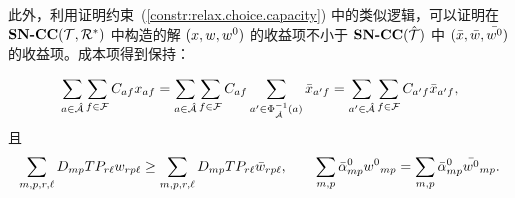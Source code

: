 此外，利用证明约束~(\ref{constr:relax.choice.capacity}) 中的类似逻辑，可以证明在 $\textbf{SN-CC}({\mathcal{T}, \mathcal{R}^{*}})$ 中构造的解 $(x, w, {w^0})$ 的收益项不小于 $\textbf{SN-CC}({\hat{\mathcal{T}}})$ 中 $(\bar{x}, \bar{w}, \bar{{w^0}})$ 的收益项。成本项得到保持：

\[
    \sum_{a\in\arcSet}\sum_{f\in\fleetSet}\cost_{af}\fleetAssignVar_{af}
    = \sum_{a\in\arcSet}\sum_{f\in\fleetSet}\cost_{af}
      \sum_{a'\in\Phi_{\arcSet}^{-1}(a)}\bar{\fleetAssignVar}_{a'f}
    = \sum_{a'\in\full{\arcSet}}\sum_{f\in\fleetSet}\cost_{a'f}\bar{\fleetAssignVar}_{a'f},
\]
且
\[
    \sum_{m,p,r,\ell}D_{mp}TP_{r\ell}w_{rp\ell}
    \ge \sum_{m,p,r,\ell}D_{mp}TP_{r\ell}\bar{w}_{rp\ell},
    \qquad
    \sum_{m,p}\bar{\alpha}^0_{mp}{w^0}_{mp}
    = \sum_{m,p}\bar{\alpha}^0_{mp}\bar{{w^0}}_{mp}.
\]
